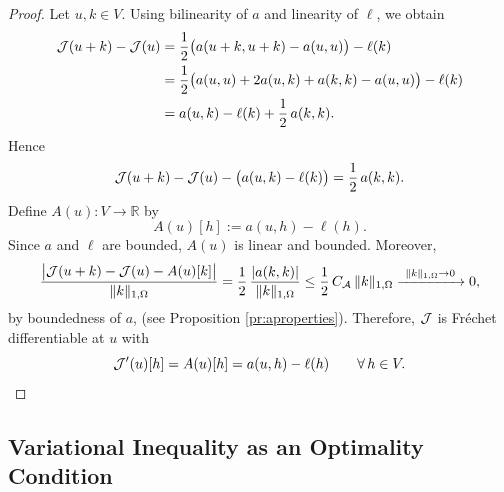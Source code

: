 \begin{proof}
	Let $u,k\in V$. Using bilinearity of $a$ and linearity of $\ell$, we obtain
	\begin{align*}
		{\mathcal J}(u+k)-{\mathcal J}(u)
		 & =\frac12\bigl(a(u+k,u+k)-a(u,u)\bigr)-\ell(k)            \\
		 & =\frac12\bigl(a(u,u)+2a(u,k)+a(k,k)-a(u,u)\bigr)-\ell(k) \\
		 & = a(u,k)-\ell(k)+\frac12\,a(k,k).
	\end{align*}
	Hence
	\begin{equation*}
		{\mathcal J}(u+k)-{\mathcal J}(u)-\bigl(a(u,k)-\ell(k)\bigr)
		=\frac12\,a(k,k).
	\end{equation*}
	Define $A(u):V\to\mathbb R$ by
	\begin{equation*}
		A(u)[h]:=a(u,h)-\ell(h).
	\end{equation*}
	Since $a$ and $\ell$ are bounded, $A(u)$ is linear and bounded. Moreover,
	\begin{equation*}
		\frac{\bigl|\cJ(u+k)-\cJ(u)-A(u)[k]\bigr|}{\|k\|_{1,\Omega}}
		=\frac{1}{2}\,\frac{|a(k,k)|}{\|k\|_{1,\Omega}}
		\le \frac12\,C_{\mathcal A}\,\|k\|_{1,\Omega}\xrightarrow{\ \|k\|_{1,\Omega}\to 0\ }0,
	\end{equation*}
	by boundedness of $a$, (see Proposition \ref{pr:aproperties}). Therefore, ${\mathcal J}$ is Fréchet differentiable at $u$ with
	\begin{equation*}
		{\mathcal J}^\prime(u)[h]=A(u)[h]=a(u,h)-\ell(h)
		\qquad \forall\, h\in V.
	\end{equation*}
\end{proof}

\subsection{Variational Inequality as an Optimality Condition}

